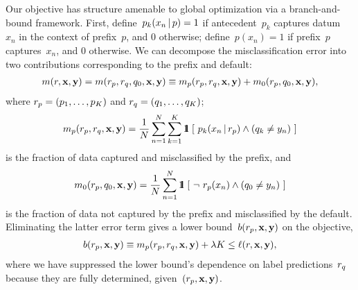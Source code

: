 Our objective has structure amenable to global optimization via a branch-and-bound framework.
%
First, define~${p_k(x_n \,|\, p) = 1}$ if antecedent~$p_k$ captures datum~$x_n$
in the context of prefix~$p$, and 0 otherwise;
define~${p(x_n) = 1}$ if prefix~$p$ captures~$x_n$, and 0 otherwise.
%
We can decompose the misclassification error into two contributions
corresponding to the prefix and default:
\begin{align}
m(\RL, \x, \y) = m(\Prefix, r_q, q_0, \x, \y) \equiv m_p(\Prefix, \RL_q, \x, \y) + m_0(\Prefix, q_0, \x, \y),
\end{align}
where ${{r_p} = (p_1, \dots, p_K)}$ and ${{r}_q = (q_1, \dots, q_K)}$;
\begin{align}
m_p(\Prefix, \RL_q, \x, \y) =
\frac{1}{N} \sum_{n=1}^N \sum_{k=1}^K \eins ~[~ p_k(x_n \given \Prefix) \wedge (q_k \neq y_n) ~]
\end{align}
is the fraction of data captured and misclassified by the prefix, and
\begin{align}
m_0(\Prefix, q_0, \x, \y) =
\frac{1}{N} \sum_{n=1}^N \eins ~[~ \neg~ \Prefix(x_n) \wedge (q_0 \neq y_n) ~]
\end{align}
is the fraction of data not captured by the prefix and misclassified by the default.
%
Eliminating the latter error term gives a lower bound~$b({r_p}, \mathbf{x}, \mathbf{y})$ on the objective,
\begin{align}
b(\Prefix, \x, \y) \equiv m_p(\Prefix, \RL_q, \x, \y) + \Reg K \le \ell(\RL, \x, \y),
\label{eq:lower-bound}
\end{align}
where we have suppressed the lower bound's dependence on label predictions~${r}_q$
because they are fully determined, given~${({r_p}, \mathbf{x}, \mathbf{y})}$.

